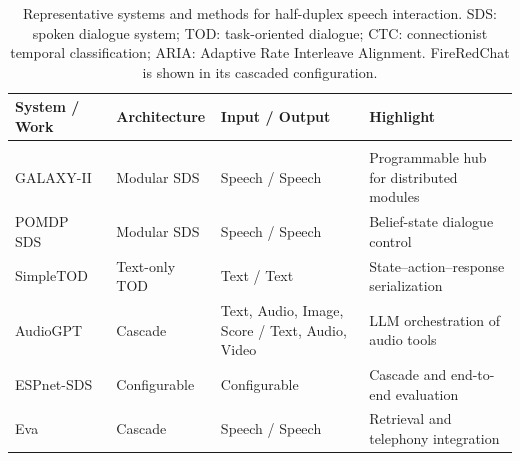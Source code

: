 
\begin{table}[!tp]
    \centering
    \caption{
        Representative systems and methods for half-duplex speech interaction.
        SDS: spoken dialogue system; TOD: task-oriented dialogue;
        CTC: connectionist temporal classification;
        ARIA: Adaptive Rate Interleave Alignment.
        FireRedChat is shown in its cascaded configuration.
    }
    \label{tab:half-duplex-systems}
    \scriptsize
    \setlength{\tabcolsep}{3pt}
    \renewcommand{\arraystretch}{1.3}

    \begin{tabularx}{\textwidth}{
        @{}
        >{\raggedright\arraybackslash}p{}
        >{\raggedright\arraybackslash}p{}
        >{\raggedright\arraybackslash}p{}
        >{\raggedright\arraybackslash}X
        @{}
    }
        \toprule
        \textbf{System / Work}
        & \textbf{Architecture}
        & \textbf{Input / Output}
        & \textbf{Highlight} \\
        \midrule

        \multicolumn{4}{@{}l}{\textit{Text-centric cascaded systems and methods}} \\
        \midrule

        GALAXY-II~\citep{DBLP:conf/interspeech/SeneffHLPSZ98}
        & Modular SDS & Speech / Speech
        & Programmable hub for distributed modules \\

        POMDP SDS~\citep{DBLP:journals/pieee/YoungGTW13}
        & Modular SDS & Speech / Speech
        & Belief-state dialogue control \\

        SimpleTOD~\citep{DBLP:conf/nips/Hosseini-AslMWY20}
        & Text-only TOD & Text / Text
        & State--action--response serialization \\

        AudioGPT~\citep{DBLP:conf/aaai/HuangLYSCYWHHLR24}
        & Cascade & Text, Audio, Image, Score / Text, Audio, Video
        & LLM orchestration of audio tools \\

        ESPnet-SDS~\citep{DBLP:conf/naacl/Arora0STCBFKTSS25}
        & Configurable & Configurable
        & Cascade and end-to-end evaluation \\

        Eva~\citep{DBLP:conf/ifaamas/QinZ25}
        & Cascade & Speech / Speech
        & Retrieval and telephony integration \\


\end{tabularx}
\end{table}
